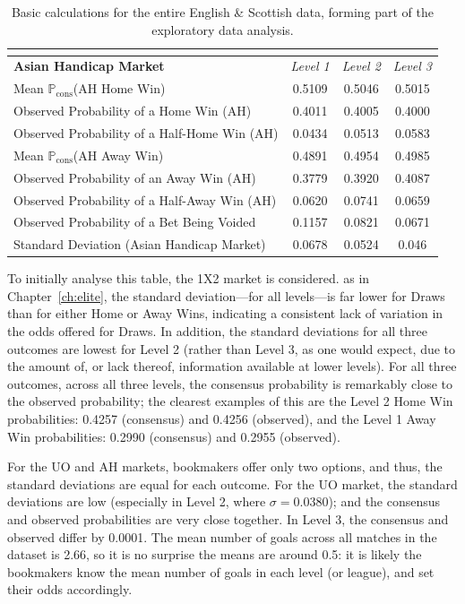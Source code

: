 \documentclass[a4paper,10pt]{report}
\begin{document}
\begin{table}[h!]
\begin{center}
\begin{tabular}[h!]{l||c|c|c}
\multicolumn{4}{l}{ } \\\hline
\textbf{Asian Handicap Market}& \textit{Level 1}& \textit{Level 2}& \textit{Level 3} \\ \hline
Mean $\mathbb{P}_{\textrm{cons}}$(AH Home Win)  & 0.5109 & 0.5046 & 0.5015 \\
Observed Probability of a Home Win (AH)			& 0.4011 & 0.4005 & 0.4000 \\
Observed Probability of a Half-Home Win (AH)	& 0.0434 & 0.0513 & 0.0583 \\ \hline
Mean $\mathbb{P}_{\textrm{cons}}$(AH Away Win)  & 0.4891 & 0.4954 & 0.4985\\
Observed Probability of an Away Win (AH)		& 0.3779 & 0.3920 & 0.4087 \\
Observed Probability of a Half-Away Win (AH)	& 0.0620 & 0.0741 & 0.0659 \\ \hline
Observed Probability of a Bet Being Voided 		& 0.1157 & 0.0821 & 0.0671 \\ \hdashline
Standard Deviation (Asian Handicap Market)		& 0.0678 & 0.0524 & 0.046
\end{tabular}\end{center} \caption{Basic calculations for the entire English \& Scottish data, forming part of the exploratory data analysis.} \label{tab:edaenscocalcs}\end{table}

To initially analyse this table, the 1X2 market is considered. as in Chapter~\ref{ch:elite}, the standard deviation---for all levels---is far lower for Draws than for either Home or Away Wins, indicating a consistent lack of variation in the odds offered for Draws. In addition, the standard deviations for all three outcomes are lowest for Level 2 (rather than Level 3, as one would expect, due to the amount of, or lack thereof, information available at lower levels). For all three outcomes, across all three levels, the consensus probability is remarkably close to the observed probability; the clearest examples of this are the Level 2 Home Win probabilities: 0.4257 (consensus) and 0.4256 (observed), and the Level 1 Away Win probabilities: 0.2990 (consensus) and 0.2955 (observed). \vspace{3mm}

For the UO and AH markets, bookmakers offer only two options, and thus, the standard deviations are equal for each outcome. For the UO market, the standard deviations are low (especially in Level 2, where $\sigma = 0.0380$); and the consensus and observed probabilities are very close together. In Level 3, the consensus and observed differ by 0.0001. The mean number of goals across all matches in the dataset is 2.66, so it is no surprise the means are around 0.5: it is likely the bookmakers know the mean number of goals in each level (or league), and set their odds accordingly. \vspace{3mm}
\end{document}
